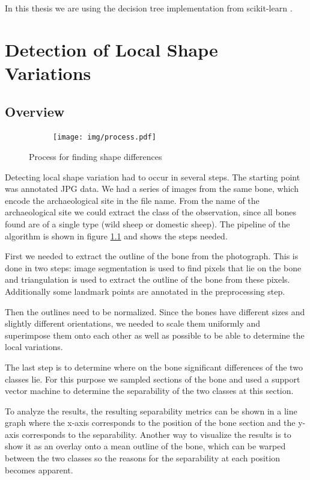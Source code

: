 \documentclass[pdftex,12pt,a4paper]{report}
\begin{document}
In this thesis we are using the decision tree implementation from scikit-learn \cite{pedregosa2011scikit}.

\chapter{Detection of Local Shape Variations}
\label{chapter:detecting-shape-variations}

\section{Overview}

\begin{figure}[h]
	\centering
	\begin{subfigure}[b]{0.75\textwidth}
		\centering
		\texttt{[image: img/process.pdf]}
	\end{subfigure}
	\caption{Process for finding shape differences}
	\label{fig:process}
\end{figure}

Detecting local shape variation had to occur in several steps. The starting point was annotated JPG data. We had a series of images from the same bone, which encode the archaeological site in the file name. From the name of the archaeological site we could extract the class of the observation, since all bones found are of a single type (wild sheep or domestic sheep). The pipeline of the algorithm is shown in figure \ref{fig:process} and shows the steps needed.

First we needed to extract the outline of the bone from the photograph. This is done in two steps: image segmentation is used to find pixels that lie on the bone and triangulation is used to extract the outline of the bone from these pixels. Additionally some landmark points are annotated in the preprocessing step.

Then the outlines need to be normalized. Since the bones have different sizes and slightly different orientations, we needed to scale them uniformly and superimpose them onto each other as well as possible to be able to determine the local variations.

The last step is to determine where on the bone significant differences of the two classes lie. For this purpose we sampled sections of the bone and used a support vector machine to determine the separability of the two classes at this section.

To analyze the results, the resulting separability metrics can be shown in a line graph where the x-axis corresponds to the position of the bone section and the y-axis corresponds to the separability. Another way to visualize the results is to show it as an overlay onto a mean outline of the bone, which can be warped between the two classes so the reasons for the separability at each position becomes apparent.
\end{document}

